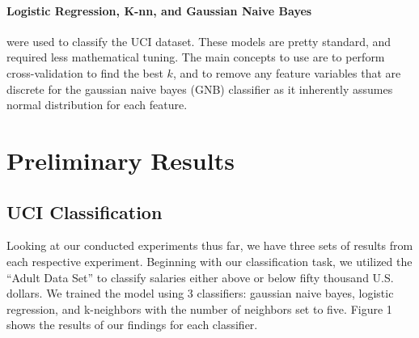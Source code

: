 \documentclass{article}
\begin{document}
\paragraph{Logistic Regression, K-nn, and Gaussian Naive Bayes} were used to classify the UCI dataset. These models are pretty standard, and required less mathematical tuning. The main concepts to use are to perform cross-validation to find the best $k$, and to remove any feature variables that are discrete for the gaussian naive bayes (GNB) classifier as it inherently assumes normal distribution for each feature. 

\section{Preliminary Results}

\subsection{UCI Classification}

Looking at our conducted experiments thus far, we have three sets of results from each respective experiment. Beginning with our classification task, we utilized the “Adult Data Set” to classify salaries either above or below fifty thousand U.S. dollars. We trained the model using 3 classifiers: gaussian naive bayes, logistic regression, and k-neighbors with the number of neighbors set to five. Figure 1 shows the results of our findings for each classifier.
\end{document}
